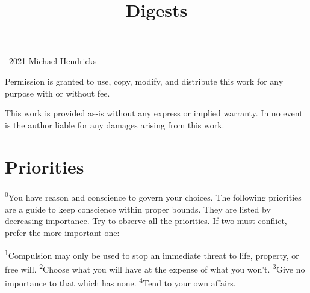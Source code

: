 \documentclass[openany,12pt,english]{book}
\title{Digests}
\author{}
\date{}
\newenvironment{para}{\par\pretolerance=100\tolerance=200\setlength{\emergencystretch}{0.6em}\relax}{\par}
\begin{document}
\maketitle

{
\thispagestyle{empty}
\vspace*{\fill}
\begin{changemargin}{.8in}{.8in}
\begin{center}
\textcopyright{}~2021 Michael Hendricks

\vspace{0.5\baselineskip}

Permission is granted to use, copy, modify, and distribute
this work for any purpose with or without fee.

\vspace{0.5\baselineskip}

This work is provided as-is without any express or implied
warranty. In no event is the author liable for any damages
arising from this work.
\end{center}
\end{changemargin}
}
\clearpage{}

\tableofcontents
\clearpage{}

\markboth{}{}
\twocolumn[\begin{changemargin}{.6in}{.6in}
\end{changemargin}]{}


\section*{Priorities}
\begin{para}
    \textsuperscript{0}\thinspace{}You have rea\-son and con\-science to gov\-ern your choices. The fol\-low\-ing priorities are a guide to keep con\-science with\-in prop\-er bounds. They are list\-ed by de\-creas\-ing im\-por\-tance. Try to ob\-serve all the priorities. If two must con\-flict, pre\-fer the more im\-por\-tant one:
\end{para}

\begin{para}
    \textsuperscript{1}\thinspace{}Com\-pul\-sion may on\-ly be used to stop an im\-me\-di\-ate threat to life, prop\-er\-ty, or free will.
    \textsuperscript{2}\thinspace{}Choose what you will have at the ex\-pense of what you won't.
    \textsuperscript{3}\thinspace{}Give no im\-por\-tance to that which has none.
    \textsuperscript{4}\thinspace{}Tend to your own af\-fairs.
\end{para}
\end{document}
